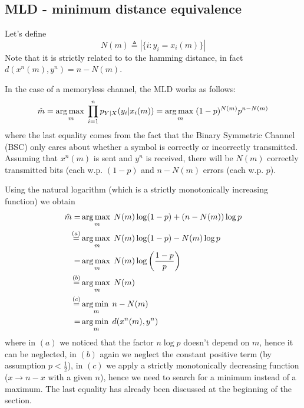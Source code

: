 
\subsection{MLD - minimum distance equivalence}
Let's define
%
\begin{equation}
N(m) \triangleq \left|\{ i: y_i=x_i(m) \} \right|
\end{equation}
%
Note that it is strictly related to to the hamming distance, in fact $d(x^n(m),y^n) = n-N(m)$.

In the case of a memoryless channel, the MLD works as follows:
%
\begin{equation}
\hat{m} = \operatorname*{arg\,max\;}_m \prod_{i=1}^{n} p_{Y|X}(y_i|x_i(m)) = \operatorname*{arg\,max\;}_m (1-p)^{N(m)} p^{n-N(m)}
\end{equation}
%
where the last equality comes from the fact that the Binary Symmetric Channel (BSC) only cares about whether a symbol is correctly or incorrectly transmitted. Assuming that $x^n(m)$ is sent and $y^n$ is received, there will be $N(m)$ correctly transmitted bits (each w.p. $(1-p)$ and $n-N(m)$ errors (each w.p. $p$).

Using the natural logarithm (which is a strictly monotonically increasing function) we obtain
%
\begin{align}
\begin{split}
\hat{m} =& \operatorname*{arg\,max\;}_m N(m)\log(1-p) + (n-N(m)) \log p\\
\stackrel{(a)}{=}& \operatorname*{arg\,max\;}_m N(m)\log(1-p) -N(m) \log p\\
=& \operatorname*{arg\,max\;}_m N(m)\log\left( \frac{1-p}{p} \right)\\
\stackrel{(b)}{=}& \operatorname*{arg\,max\;}_m N(m)\\
\stackrel{(c)}{=}& \operatorname*{arg\,min\;}_m n-N(m)\\
=& \operatorname*{arg\,min\;}_m d( x^n(m),y^n)
\end{split}
\end{align}
%
where in $(a)$ we noticed that the factor $n \log p$ doesn't depend on $m$, hence it can be neglected, in $(b)$ again we neglect the constant positive term (by assumption $p<\frac{1}{2}$), in $(c)$ we apply a strictly monotonically decreasing function ($x \rightarrow n-x$ with a given $n$), hence we need to search for a minimum instead of a maximum. The last equality has already been discussed at the beginning of the section.

